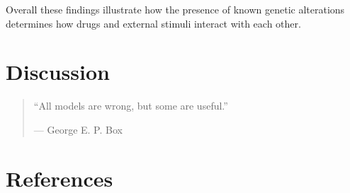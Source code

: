 \documentclass[11pt, a4paper, twosided]{book}
\begin{document}
Overall these findings illustrate how the presence of known genetic alterations determines how drugs and external stimuli interact with each other.

\hypertarget{discussion}{%
\chapter{Discussion}\label{discussion}}
\begin{quote}
``All models are wrong, but some are useful.''

\hfill --- George E. P. Box
\end{quote}
\newpage

\hypertarget{references}{%
\chapter*{References}\label{references}}

\noindent

\setlength{\parindent}{-0.5cm}
\setlength{\leftskip}{0.5cm}
\setlength{\parskip}{8pt}
\end{document}
